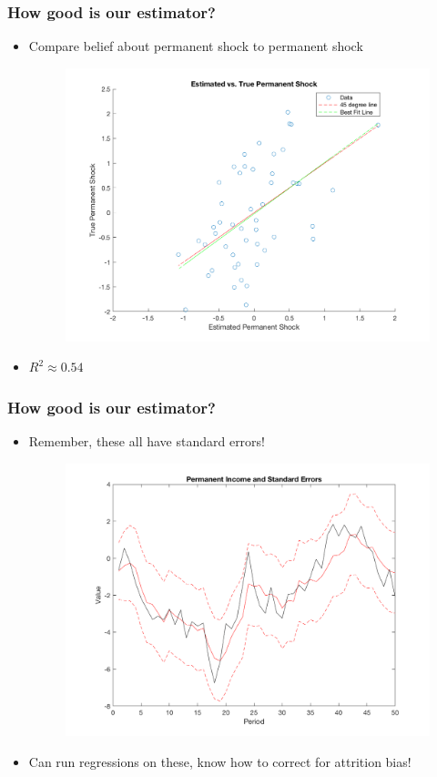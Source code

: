 \documentclass{beamer}
\begin{document}
\begin{frame}
\frametitle[alignment=center]{How good is our estimator?}
\begin{itemize}
\item Compare belief about permanent shock to permanent shock
\begin{figure}[ht!]
\centering
\includegraphics[scale=0.45]{PermShocks.png}
\end{figure}
\item $R^2\approx 0.54$
\end{itemize}
\end{frame}


\begin{frame}
\frametitle[alignment=center]{How good is our estimator?}
\begin{itemize}
\item Remember, these all have standard errors!
\begin{figure}[ht!]
\centering
\includegraphics[scale=0.45]{KalmanFilter2.png}
\end{figure}
\item Can run regressions on these, know how to correct for attrition bias!
\end{itemize}
\end{frame}
\end{document}
